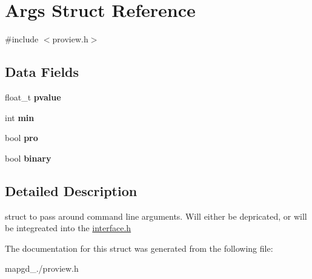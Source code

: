\hypertarget{structArgs}{\section{Args Struct Reference}
\label{structArgs}
}


{\ttfamily \#include $<$proview.\-h$>$}

\subsection*{Data Fields}
\begin{DoxyCompactItemize}
\item 
\hypertarget{structArgs_a384a1e1af35681f8adac0bebd571d372}{float\-\_\-t {\bfseries pvalue}}\label{structArgs_a384a1e1af35681f8adac0bebd571d372}

\item 
\hypertarget{structArgs_aa631808b16629f4cc4ca7f34f89b3d54}{int {\bfseries min}}\label{structArgs_aa631808b16629f4cc4ca7f34f89b3d54}

\item 
\hypertarget{structArgs_a825d174b8accceddff970b7c1594f36c}{bool {\bfseries pro}}\label{structArgs_a825d174b8accceddff970b7c1594f36c}

\item 
\hypertarget{structArgs_a244a8043a10a91b647ceb08a3d6fef9f}{bool {\bfseries binary}}\label{structArgs_a244a8043a10a91b647ceb08a3d6fef9f}

\end{DoxyCompactItemize}


\subsection{Detailed Description}
struct to pass around command line arguments. Will either be depricated, or will be integreated into the \hyperlink{interface_8h_source}{interface.\-h} 

The documentation for this struct was generated from the following file\-:\begin{DoxyCompactItemize}
\item 
mapgd\-\_./proview.\-h\end{DoxyCompactItemize}
